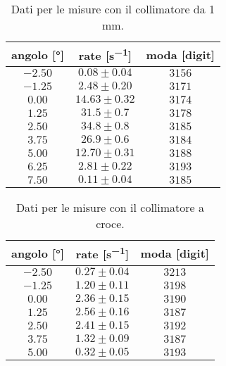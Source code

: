 \begin{table}[h]
\centering

\begin{tabular}{c|c|c}
angolo [\si{\degree}] & rate  [\si{s^{-1}}] & moda [digit] \\
\hline
$ -2.50 $ & $ 0.08 \pm 0.04 $ & $ 3156 $ \\ 
$ -1.25 $ & $ 2.48 \pm 0.20 $ & $ 3171 $ \\ 
$ 0.00 $ & $ 14.63 \pm 0.32 $ & $ 3174 $ \\ 
$ 1.25 $ & $ 31.5 \pm 0.7 $ & $ 3178 $ \\ 
$ 2.50 $ & $ 34.8 \pm 0.8 $ & $ 3185 $ \\ 
$ 3.75 $ & $ 26.9 \pm 0.6 $ & $ 3184 $ \\ 
$ 5.00 $ & $ 12.70 \pm 0.31 $ & $ 3188 $ \\ 
$ 6.25 $ & $ 2.81 \pm 0.22 $ & $ 3193 $ \\ 
$ 7.50 $ & $ 0.11 \pm 0.04 $ & $ 3185 $ \\ 

\end{tabular}

\caption{Dati per le misure con il collimatore da 1\! mm.}
\label{tab:coll1}
\end{table}



\begin{table}
\centering

\begin{tabular}{c|c|c}
angolo [\si{\degree}] & rate  [\si{s^{-1}}] & moda [digit] \\
\hline
$ -2.50 $ & $ 0.27 \pm 0.04 $ & $ 3213 $ \\ 
$ -1.25 $ & $ 1.20 \pm 0.11 $ & $ 3198 $ \\ 
$ 0.00 $ & $ 2.36 \pm 0.15 $ & $ 3190 $ \\ 
$ 1.25 $ & $ 2.56 \pm 0.16 $ & $ 3187 $ \\ 
$ 2.50 $ & $ 2.41 \pm 0.15 $ & $ 3192 $ \\ 
$ 3.75 $ & $ 1.32 \pm 0.09 $ & $ 3187 $ \\ 
$ 5.00 $ & $ 0.32 \pm 0.05 $ & $ 3193 $ \\ 

\end{tabular}

\caption{Dati per le misure con il collimatore a croce.}
\label{tab:super}
\end{table}



